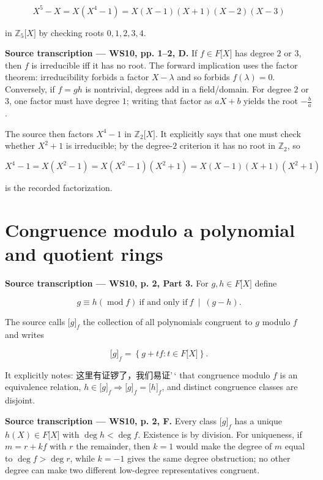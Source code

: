 \[X^{5} - X = X\left( {X^{4} - 1} \right) = X\left( {X - 1} \right)\left( {X + 1} \right)\left( {X - 2} \right)\left( {X - 3} \right)\]

in \(\mathbb{Z}_{5}\lbrack X\rbrack\) by checking roots \(0,1,2,3,4\).

\textbf{Source transcription --- WS10, pp. 1--2, D.} If \(f \in F\lbrack X\rbrack\) has degree \(2\) or \(3\), then \(f\) is irreducible iff it has no root. The forward implication uses the factor theorem: irreducibility forbids a factor \(X - \lambda\) and so forbids \(f(\lambda) = 0\). Conversely, if \(f = gh\) is nontrivial, degrees add in a field/domain. For degree \(2\) or \(3\), one factor must have degree \(1\); writing that factor as \(aX + b\) yields the root \(- \frac{b}{a}\).

The source then factors \(X^{4} - 1\) in \(\mathbb{Z}_{2}\lbrack X\rbrack\). It explicitly says that one must check whether \(X^{2} + 1\) is irreducible; by the degree-\(2\) criterion it has no root in \(\mathbb{Z}_{2}\), so

\[X^{4} - 1 = X\left( {X^{2} - 1} \right) = X\left( {X^{2} - 1} \right)\left( {X^{2} + 1} \right) = X\left( {X - 1} \right)\left( {X + 1} \right)\left( {X^{2} + 1} \right)\]

is the recorded factorization.

\section{Congruence modulo a polynomial and quotient rings}

\textbf{Source transcription --- WS10, p. 2, Part 3.} For \(g,h \in F\lbrack X\rbrack\) define

\[\left. g \equiv h\left( {\operatorname{mod}f} \right)\ \text{if and only if}\ f\  \middle| \ \left( {g - h} \right). \right.\]

The source calls \(\lbrack g\rbrack_{f}\) the collection of all polynomials congruent to \(g\) modulo \(f\) and writes

\[\lbrack g\rbrack_{f} = \left\{ {g + tf:t \in F\lbrack X\rbrack} \right\}.\]

It explicitly notes: 这里有证锣了，我们易证'\,` that congruence modulo \(f\) is an equivalence relation, \(h \in \lbrack g\rbrack_{f}\Rightarrow\lbrack g\rbrack_{f} = \lbrack h\rbrack_{f}\), and distinct congruence classes are disjoint.

\textbf{Source transcription --- WS10, p. 2, F.} Every class \(\lbrack g\rbrack_{f}\) has a unique \(h(X) \in F\lbrack X\rbrack\) with \(\deg h < \deg f\). Existence is by division. For uniqueness, if \(m = r + kf\) with \(r\) the remainder, then \(k = 1\) would make the degree of \(m\) equal to \(\deg f > \deg r\), while \(k = - 1\) gives the same degree obstruction; no other degree can make two different low-degree representatives congruent.

